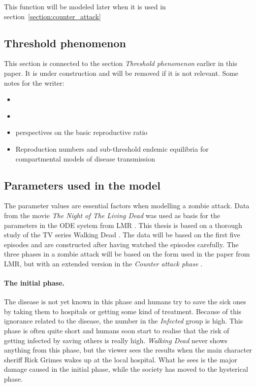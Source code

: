 \documentclass[%
twoside,                 %
final,                   %
10pt]{article}
\begin{document}
\noindent
This function will be modeled later when it is used in section~\ref{section:counter_attack}


\vspace{3mm}




\vspace{3mm}


\subsection{Threshold phenomenon}
This section is connected to the section \emph{Threshold phenomenon} earlier in this paper. It is under construction and will be removed if it is not relevant. Some notes for the writer:
\begin{itemize}
\item \cite[p.~22]{zombie-math}

\item \cite[p.~136-142]{munz2009zombies}

\item perspectives on the basic reproductive ratio

\item Reproduction numbers and sub-threshold endemic equilibria for compartmental models of disease transmission
\end{itemize}

\noindent
\subsection{Parameters used in the model}
The parameter values are essential factors when modelling a zombie attack. Data from the movie \emph{The Night of The Living Dead} was used as basis for the parameters in the ODE system from LMR \cite{zombie-math}. This thesis is based on a thorough study of the TV series Walking Dead \cite{walking_dead}. The data will be based on the first five episodes and are constructed after having watched the episodes carefully. The three phases in a zombie attack will be based on the form used in the paper from LMR, but with an extended version in the \emph{Counter attack phase} .

\paragraph{The initial phase.}
The disease is not yet known in this phase and humans try to save the sick ones by taking them to hospitals or getting some kind of treatment. Because of this ignorance related to the disease, the number in the \emph{Infected} group is high. This phase is often quite short and humans soon start to realise that the risk of getting infected by saving others is really high. \emph{Walking Dead} never shows anything from this phase, but the viewer sees the results when the main character sheriff Rick Grimes wakes up at the local hospital. What he sees is the major damage caused in the initial phase, while the society has moved to the hysterical phase.
\end{document}
